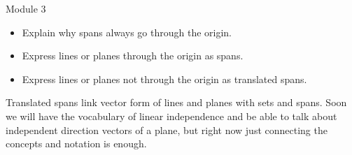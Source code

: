 	\begin{bookonly}\begin{center}\doublegrid\end{center}\end{bookonly}


\begin{lesson}

	Module 3

	\begin{itemize}
		\item Explain why spans always go through the origin.
		\item Express lines or planes through the origin as spans.
		\item Express lines or planes not through the origin as translated spans.
	\end{itemize}

	Translated spans link vector form of lines and planes with sets and spans.
	Soon we will have the vocabulary of linear independence and be able to
	talk about independent direction vectors of a plane, but right now just connecting
	the concepts and notation is enough.

\end{lesson}

